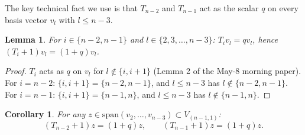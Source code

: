 \documentclass[11pt]{article}
\newtheorem{lemma}[theorem]{Lemma}
\newtheorem{corollary}[theorem]{Corollary}
\theoremstyle{definition}
\begin{document}
The key technical fact we use is that $T_{n-2}$ and $T_{n-1}$ act as
the scalar $q$ on every basis vector $v_l$ with $l \le n-3$.

\begin{lemma}\label{lem:Tact-low}
For $i \in \{n-2, n-1\}$ and $l \in \{2, 3, \ldots, n-3\}$:
$T_i v_l = q v_l$, hence $(T_i+1) v_l = (1+q) v_l$.
\end{lemma}

\begin{proof}
$T_i$ acts as $q$ on $v_l$ for $l \notin \{i, i+1\}$
(Lemma 2 of the May-8 morning paper). For $i = n-2$:
$\{i, i+1\} = \{n-2, n-1\}$, and $l \le n-3$ has $l \notin \{n-2, n-1\}$.
For $i = n-1$: $\{i, i+1\} = \{n-1, n\}$, and $l \le n-3$ has
$l \notin \{n-1, n\}$. \qedhere
\end{proof}

\begin{corollary}\label{cor:Rnp-on-low}
For any $z \in \mathrm{span}(v_2, \ldots, v_{n-3}) \subset V_{(n-1,1)}$:
\[
   (T_{n-2}+1)z = (1+q) z, \qquad (T_{n-1}+1)z = (1+q) z.
\]
\end{corollary}
\end{document}

